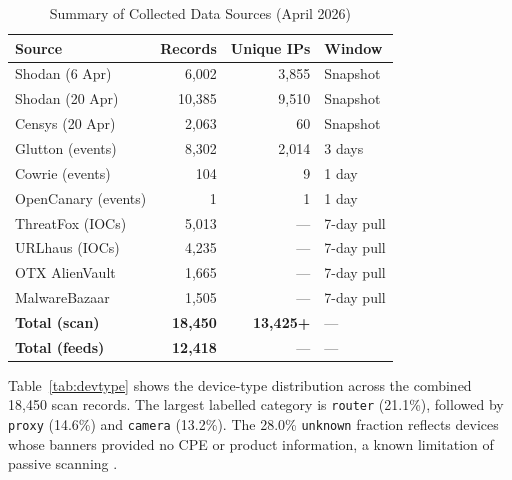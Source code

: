 \documentclass[journal]{IEEEtran}
\begin{document}
\begin{table}[!t]
  \caption{Summary of Collected Data Sources (April 2026)}
  \label{tab:dataset}
  \centering
  \renewcommand{\arraystretch}{1.2}
  \begin{tabular}{@{}lrrl@{}}
    \toprule
    Source & Records & Unique IPs & Window \\
    \midrule
    Shodan (6 Apr)      &  6{,}002 &  3{,}855 & Snapshot \\
    Shodan (20 Apr)     & 10{,}385 &  9{,}510 & Snapshot \\
    Censys (20 Apr)     &  2{,}063 &       60 & Snapshot \\
    \midrule
    Glutton (events)    &  8{,}302 &  2{,}014 & 3 days \\
    Cowrie (events)     &      104 &         9 & 1 day  \\
    OpenCanary (events) &        1 &         1 & 1 day  \\
    \midrule
    ThreatFox (IOCs)    &  5{,}013 & --- & 7-day pull \\
    URLhaus (IOCs)      &  4{,}235 & --- & 7-day pull \\
    OTX AlienVault      &  1{,}665 & --- & 7-day pull \\
    MalwareBazaar       &  1{,}505 & --- & 7-day pull \\
    \midrule
    \textbf{Total (scan)} & \textbf{18{,}450} & \textbf{13{,}425+} & --- \\
    \textbf{Total (feeds)} & \textbf{12{,}418} & --- & --- \\
    \bottomrule
  \end{tabular}
\end{table}

Table~\ref{tab:devtype} shows the device-type distribution across the combined
18{,}450 scan records.
The largest labelled category is \texttt{router} (21.1\%), followed by
\texttt{proxy} (14.6\%) and \texttt{camera} (13.2\%).
The 28.0\% \texttt{unknown} fraction reflects devices whose banners provided
no CPE or product information, a known limitation of passive scanning
\cite{durumeric2015search}.
\end{document}
